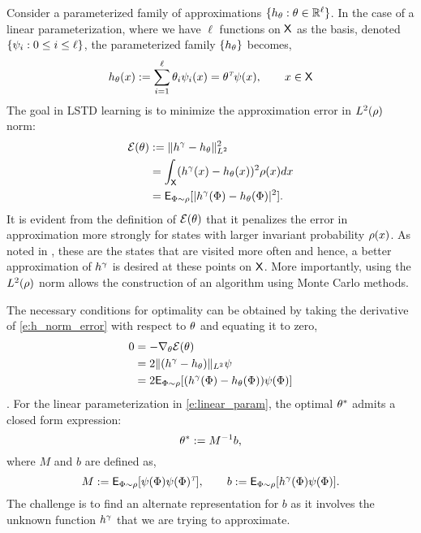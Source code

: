 Consider a parameterized family of approximations $\{h_\theta : \theta \in \mathbb{R}^\ell\}$. In the case of a linear parameterization, where we have $\ell$ functions on ${\sf X}$ as the basis, denoted $\{\psi_i : 0 \leq i \leq \ell\}$, the parameterized family $\{h_\theta\}$ becomes,
\begin{equation}
h_\param(x) := \sum_{i=1}^\ell \param_i \basis_i(x) = \param^\transpose \basis(x), \qquad x \in \state
\label{e:linear_param}
\end{equation}
The goal in LSTD learning is to minimize the approximation error in $L^2(\rho)$ norm:
\begin{equation}
\begin{aligned}
\mathcal{E}(\param) &:=  \| h^\discount - h_\param \|^2_{L^2} \\
& = \int_\state (h^\discount(x) - h_\param(x))^2 \pr(x) dx \\
& = \Expect_{\markovstate \sim \pr} [|h^\discount(\markovstate) - h_\param(\markovstate)|^2].
\label{e:h_norm_error}
\end{aligned}
\end{equation}
It is evident from the definition of $\mathcal{E}(\theta)$ that it penalizes the error in approximation more strongly for states with larger invariant probability $\rho(x)$. As noted in \cite{ctcn}, these are the states that are visited more often and hence, a better approximation of $h^\gamma$ is desired at these points on ${\sf X}$. More importantly, using the $L^2(\rho)$ norm allows the construction of an algorithm using Monte Carlo methods. 

The necessary conditions for optimality can be obtained by taking the derivative of \eqref{e:h_norm_error} with respect to $\theta$ and equating it to zero, 
\[
\begin{aligned}
0 &= - \nabla_\theta \mathcal{E}(\theta)\\
& = 2 \|(h^\gamma - h_\theta) \|_{L^2} \psi \\
& = 2 {\sf E}_{\Phi \sim \rho} [(h^\gamma(\Phi) - h_\theta(\Phi)) \psi(\Phi)]
\end{aligned}
\] 
.
For the linear parameterization in \eqref{e:linear_param}, the optimal $\theta^*$ admits a closed form expression:
\begin{equation}
\param^* := M^{-1} b,
\label{e:param_opt_lstd}
\end{equation}
where $M$ and $b$ are defined as,
\[
M: = {\sf E}_{\Phi \sim \rho} [\psi(\Phi) \psi(\Phi)^{\hbox{\tiny\it T}}], \qquad b:= {\sf E}_{\Phi \sim \rho} [h^\gamma(\Phi) \psi(\Phi)].
\]
The challenge is to find an alternate representation for $b$ as it involves the unknown function $h^\gamma$ that we are trying to approximate.  

